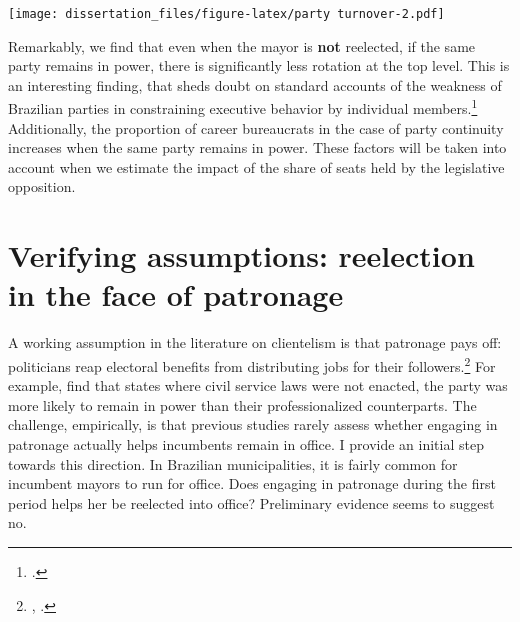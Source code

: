 \documentclass[12pt,]{book}
\newenvironment{Shaded}{\begin{snugshade}}{\end{snugshade}}
\newcommand{\DataTypeTok}[1]{\textcolor[rgb]{0.13,0.29,0.53}{#1}}
\newcommand{\FloatTok}[1]{\textcolor[rgb]{0.00,0.00,0.81}{#1}}
\newcommand{\KeywordTok}[1]{\textcolor[rgb]{0.13,0.29,0.53}{\textbf{#1}}}
\newcommand{\NormalTok}[1]{#1}
\newcommand{\OperatorTok}[1]{\textcolor[rgb]{0.81,0.36,0.00}{\textbf{#1}}}
\newcommand{\StringTok}[1]{\textcolor[rgb]{0.31,0.60,0.02}{#1}}
\let\rmarkdownfootnote\footnote%
\def\footnote{\protect\rmarkdownfootnote}
\begin{document}
\begin{Shaded}
\begin{Highlighting}[]
{{{{{{\StringTok{  }\KeywordTok{mandate_year}\NormalTok{() }\OperatorTok{+}
\StringTok{  }\NormalTok{theme_clean }\OperatorTok{+}
\StringTok{  }\KeywordTok{theme}\NormalTok{(}
    \DataTypeTok{legend.position =} \KeywordTok{c}\NormalTok{(}\FloatTok{0.925}\NormalTok{, }\FloatTok{0.95}\NormalTok{),}
    \DataTypeTok{legend.title =} \KeywordTok{element_blank}\NormalTok{()}
\NormalTok{  ) }\OperatorTok{+}
\StringTok{  }\KeywordTok{ggtitle}\NormalTok{(}\StringTok{"Proportion of career bureaucrats: party turnover"}\NormalTok{)}
\end{Highlighting}
\end{Shaded}

\texttt{[image: dissertation\_files/figure-latex/party turnover-2.pdf]}

Remarkably, we find that even when the mayor is \textbf{not} reelected, if the same party remains in power, there is significantly less rotation at the top level. This is an interesting finding, that sheds doubt on standard accounts of the weakness of Brazilian parties in constraining executive behavior by individual members.\footnote{\citet{klasnja_incumbency_2017}.} Additionally, the proportion of career bureaucrats in the case of party continuity increases when the same party remains in power. These factors will be taken into account when we estimate the impact of the share of seats held by the legislative opposition.

\hypertarget{verifying-assumptions-reelection-in-the-face-of-patronage}{%
\section{Verifying assumptions: reelection in the face of patronage}\label{verifying-assumptions-reelection-in-the-face-of-patronage}}

A working assumption in the literature on clientelism is that patronage pays off: politicians reap electoral benefits from distributing jobs for their followers.\footnote{\citet{brollo_victor_2017}, \citet{calvo_who_2004}.} For example, \citet{folke_patronage_2011} find that states where civil service laws were not enacted, the party was more likely to remain in power than their professionalized counterparts. The challenge, empirically, is that previous studies rarely assess whether engaging in patronage actually helps incumbents remain in office. I provide an initial step towards this direction. In Brazilian municipalities, it is fairly common for incumbent mayors to run for office. Does engaging in patronage during the first period helps her be reelected into office? Preliminary evidence seems to suggest no.
\end{document}
